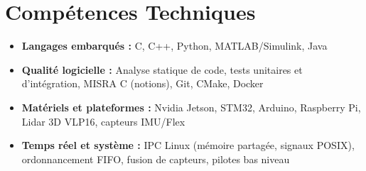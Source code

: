 \documentclass[a4paper,11pt]{article}
\begin{document}
\section{Compétences Techniques}
\begin{itemize}[leftmargin=*, nosep]
    \item \small{\textbf{Langages embarqués :} C, C++, Python, MATLAB/Simulink, Java}
    \item \small{\textbf{Qualité logicielle :} Analyse statique de code, tests unitaires et d'intégration, MISRA C (notions), Git, CMake, Docker}
    \item \small{\textbf{Matériels et plateformes :} Nvidia Jetson, STM32, Arduino, Raspberry Pi, Lidar 3D VLP16, capteurs IMU/Flex}
    \item \small{\textbf{Temps réel et système :} IPC Linux (mémoire partagée, signaux POSIX), ordonnancement FIFO, fusion de capteurs, pilotes bas niveau}
\end{itemize}

\end{document}
